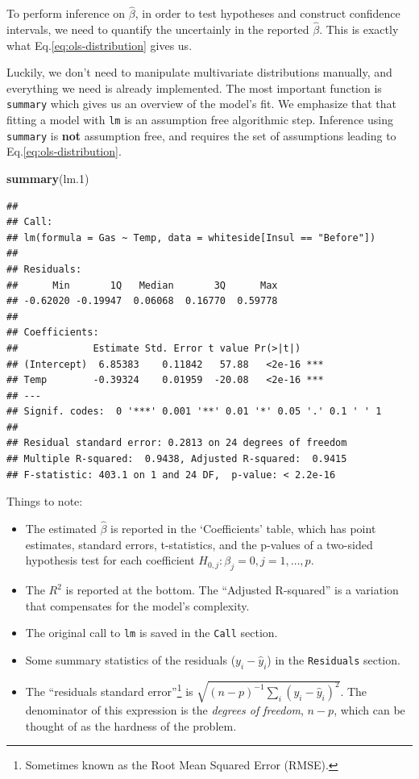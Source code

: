 \documentclass[]{book}
\newenvironment{Shaded}{\begin{snugshade}}{\end{snugshade}}
\newcommand{\KeywordTok}[1]{\textcolor[rgb]{0.13,0.29,0.53}{\textbf{#1}}}
\newcommand{\DecValTok}[1]{\textcolor[rgb]{0.00,0.00,0.81}{#1}}
\newcommand{\NormalTok}[1]{#1}
\providecommand{\tightlist}{%
  \setlength{\itemsep}{0pt}\setlength{\parskip}{0pt}}
\theoremstyle{definition}
\theoremstyle{definition}
\theoremstyle{definition}
\theoremstyle{remark}
\begin{document}
To perform inference on \(\hat \beta\), in order to test hypotheses and
construct confidence intervals, we need to quantify the uncertainly in
the reported \(\hat \beta\). This is exactly what
Eq.\eqref{eq:ols-distribution} gives us.

Luckily, we don't need to manipulate multivariate distributions
manually, and everything we need is already implemented. The most
important function is \texttt{summary} which gives us an overview of the
model's fit. We emphasize that that fitting a model with \texttt{lm} is
an assumption free algorithmic step. Inference using \texttt{summary} is
\textbf{not} assumption free, and requires the set of assumptions
leading to Eq.\eqref{eq:ols-distribution}.

\begin{Shaded}
\begin{Highlighting}[]
\KeywordTok{summary}\NormalTok{(lm.}\DecValTok{1}\NormalTok{)}
\end{Highlighting}
\end{Shaded}

\begin{verbatim}
## 
## Call:
## lm(formula = Gas ~ Temp, data = whiteside[Insul == "Before"])
## 
## Residuals:
##      Min       1Q   Median       3Q      Max 
## -0.62020 -0.19947  0.06068  0.16770  0.59778 
## 
## Coefficients:
##             Estimate Std. Error t value Pr(>|t|)    
## (Intercept)  6.85383    0.11842   57.88   <2e-16 ***
## Temp        -0.39324    0.01959  -20.08   <2e-16 ***
## ---
## Signif. codes:  0 '***' 0.001 '**' 0.01 '*' 0.05 '.' 0.1 ' ' 1
## 
## Residual standard error: 0.2813 on 24 degrees of freedom
## Multiple R-squared:  0.9438, Adjusted R-squared:  0.9415 
## F-statistic: 403.1 on 1 and 24 DF,  p-value: < 2.2e-16
\end{verbatim}

Things to note:

\begin{itemize}
\tightlist
\item
  The estimated \(\hat \beta\) is reported in the `Coefficients' table,
  which has point estimates, standard errors, t-statistics, and the
  p-values of a two-sided hypothesis test for each coefficient
  \(H_{0,j}:\beta_j=0, j=1,\dots,p\).
\item
  The \(R^2\) is reported at the bottom. The ``Adjusted R-squared'' is a
  variation that compensates for the model's complexity.
\item
  The original call to \texttt{lm} is saved in the \texttt{Call}
  section.
\item
  Some summary statistics of the residuals (\(y_i-\hat y_i\)) in the
  \texttt{Residuals} section.
\item
  The ``residuals standard error''\footnote{Sometimes known as the Root
    Mean Squared Error (RMSE).} is
  \(\sqrt{(n-p)^{-1} \sum_i (y_i-\hat y_i)^2}\). The denominator of this
  expression is the \emph{degrees of freedom}, \(n-p\), which can be
  thought of as the hardness of the problem.
\end{itemize}
\end{document}
